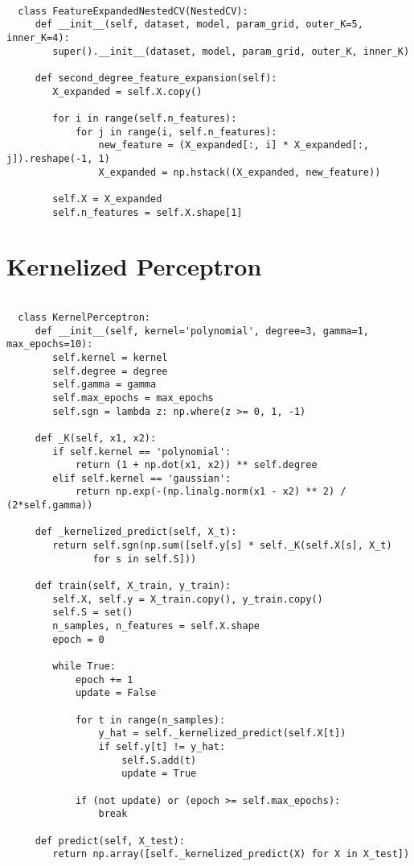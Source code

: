 \begin{verbatim}

  class FeatureExpandedNestedCV(NestedCV):
     def __init__(self, dataset, model, param_grid, outer_K=5, inner_K=4):
        super().__init__(dataset, model, param_grid, outer_K, inner_K)

     def second_degree_feature_expansion(self):
        X_expanded = self.X.copy()

        for i in range(self.n_features):
            for j in range(i, self.n_features):
                new_feature = (X_expanded[:, i] * X_expanded[:, j]).reshape(-1, 1)
                X_expanded = np.hstack((X_expanded, new_feature))

        self.X = X_expanded
        self.n_features = self.X.shape[1]

\end{verbatim}


\section{Kernelized Perceptron}\label{appendix:kernel_perceptron}

\begin{verbatim}

  class KernelPerceptron:
     def __init__(self, kernel='polynomial', degree=3, gamma=1, max_epochs=10):
        self.kernel = kernel
        self.degree = degree
        self.gamma = gamma
        self.max_epochs = max_epochs
        self.sgn = lambda z: np.where(z >= 0, 1, -1)

     def _K(self, x1, x2):
        if self.kernel == 'polynomial':
            return (1 + np.dot(x1, x2)) ** self.degree
        elif self.kernel == 'gaussian':
            return np.exp(-(np.linalg.norm(x1 - x2) ** 2) / (2*self.gamma))

     def _kernelized_predict(self, X_t):
        return self.sgn(np.sum([self.y[s] * self._K(self.X[s], X_t)
               for s in self.S]))

     def train(self, X_train, y_train):
        self.X, self.y = X_train.copy(), y_train.copy()
        self.S = set()
        n_samples, n_features = self.X.shape
        epoch = 0

        while True:
            epoch += 1
            update = False

            for t in range(n_samples):
                y_hat = self._kernelized_predict(self.X[t])
                if self.y[t] != y_hat:
                    self.S.add(t)
                    update = True

            if (not update) or (epoch >= self.max_epochs):
                break

     def predict(self, X_test):
        return np.array([self._kernelized_predict(X) for X in X_test])

\end{verbatim}


